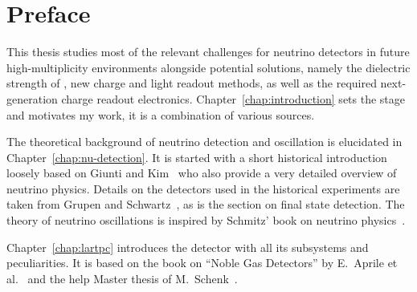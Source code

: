 \renewcommand{\Chapter}{{Preface}}
\chapter*{\Chapter}
\chaptermark{\Chapter}

This thesis studies most of the relevant challenges for \lartpc{} neutrino detectors in future high-multiplicity environments alongside potential solutions, namely the dielectric strength of \lar{}, new charge and light readout methods, as well as the required next-generation charge readout electronics.
Chapter~\ref{chap:introduction} sets the stage and motivates my work, it is a combination of various sources.

The theoretical background of neutrino detection and oscillation is elucidated in Chapter~\ref{chap:nu-detection}.
It is started with a short historical introduction loosely based on Giunti and Kim~\cite{giunti} who also provide a very detailed overview of neutrino physics.
Details on the detectors used in the historical experiments are taken from Grupen and Schwartz~\cite{grupen}, as is the section on final state detection.
The theory of neutrino oscillations is inspired by Schmitz' book on neutrino physics~\cite{schmitz}.

Chapter~\ref{chap:lartpc} introduces the \lartpc{} detector with all its subsystems and peculiarities.
It is based on the book on ``Noble Gas Detectors'' by E.\ Aprile et al.~\cite{NobleGasDetectors} and the \gls{help} Master thesis of M.\ Schenk~\cite{michu}.

